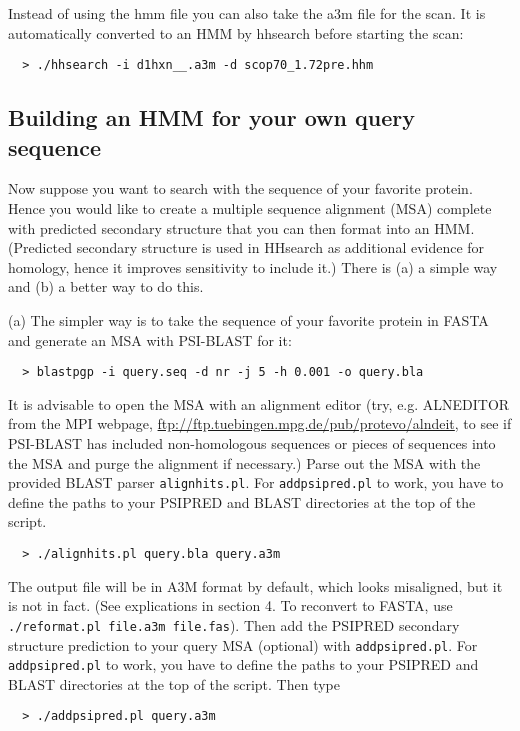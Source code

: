 \documentclass[11pt,a4paper]{article}
\begin{document}
Instead of using the hmm file you can also take the a3m file for the scan. It is 
automatically converted to an HMM by hhsearch before starting the scan:
\begin{verbatim}
  > ./hhsearch -i d1hxn__.a3m -d scop70_1.72pre.hhm
\end{verbatim}


\subsection{Building an HMM for your own query sequence}

Now suppose you want to search with the sequence of your favorite protein.
Hence you would like to create a multiple sequence alignment (MSA) complete with 
predicted secondary structure that you can then format into an HMM. (Predicted 
secondary structure is used in HHsearch as additional evidence for homology, 
hence it improves sensitivity to include it.) There is (a) a simple way and 
(b) a better way to do this. 

(a) The simpler way is to take the sequence of your favorite protein in FASTA and 
generate an MSA with PSI-BLAST for it:
\begin{verbatim}
  > blastpgp -i query.seq -d nr -j 5 -h 0.001 -o query.bla
\end{verbatim}

It is advisable to open the MSA with an alignment editor (try, e.g. ALNEDITOR 
from the MPI webpage, \url{ftp://ftp.tuebingen.mpg.de/pub/protevo/alndeit}, to see if
PSI-BLAST has included non-homologous sequences or pieces of sequences into the 
MSA and purge the alignment if necessary.) Parse out the MSA
with the provided BLAST parser \verb`alignhits.pl`. For \verb`addpsipred.pl` to work, you have to 
define the paths to your PSIPRED and BLAST directories at the top of the script.
\begin{verbatim}
  > ./alignhits.pl query.bla query.a3m
\end{verbatim}

The output file will be in A3M format by default, which looks misaligned, but it is 
not in fact. (See explications in section 4. To reconvert to FASTA, use \verb`./reformat.pl file.a3m file.fas`). Then add the PSIPRED secondary structure prediction to your query MSA (optional) 
with \verb`addpsipred.pl`. For \verb`addpsipred.pl` to work, you have to define 
the paths to your PSIPRED and BLAST  directories at the top of the script. Then type
\begin{verbatim}
  > ./addpsipred.pl query.a3m
\end{verbatim}
\end{document}
